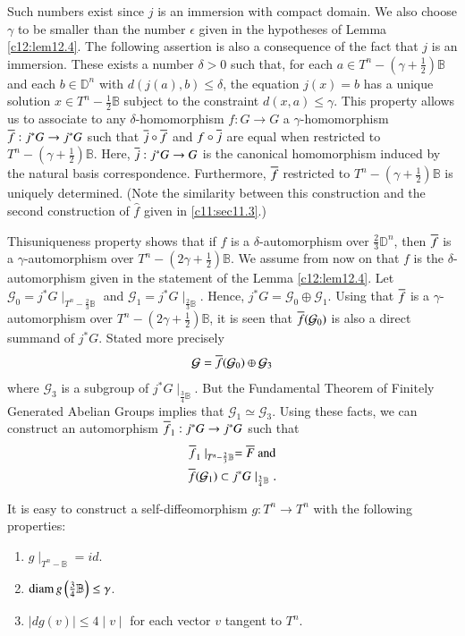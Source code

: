Such numbers exist since $j$ is an immersion with compact domain. We
also choose $\gamma$ to be smaller than the number $\epsilon$ given in
the hypotheses of Lemma \ref{c12:lem12.4}. The following assertion is
also a consequence of the fact that $j$ is an immersion. These exists
a number $\delta > 0$ such that, for each $a \in T^n- \left(\gamma +
\frac{1}{2} \right)\mathbb{B}$ and each $b \in \mathbb{D}^n$ with $d(j
(a), b)\leq \delta$, the equation $j(x) =b$ has a unique solution $x
\in T^n- \frac{1}{2} \mathbb{B}$ subject to the constraint $d(x,
a)\leq \gamma$. This property allows us to associate to any
$\delta$-homomorphism $f: G \to G$ a $\gamma$-homomorphism $\overline{f} :
j^* G \to j^* G$ such that $\overline{j} \circ \overline{f}$ and $f \circ \overline{j}$
are equal when restricted to $T^n - \left(\gamma + \frac{1}{2}
\right)\mathbb{B}$. Here, $\overline{j}: j^* G \to G$ is the canonical
homomorphism induced by the natural basis correspondence. Furthermore,
$\overline{f}$ restricted to $T^n- \left(\gamma + \frac{1}{2}
\right)\mathbb{B}$ is uniquely determined. (Note the similarity
between this construction and the second construction of $\hat{f}$
given in \ref{c11:sec11.3}.)

This\pageoriginale uniqueness property shows that if $f$ is a
$\delta$-automorphism over $\frac{2}{3} \mathbb{D}^n$, then $\overline{f}$
is a $\gamma$-automorphism over $T^n- (2 \gamma +
\frac{1}{2})\mathbb{B}$. We assume from now on that $f$ is the
$\delta$-automorphism given in the statement of the Lemma
\ref{c12:lem12.4}. Let $\mathcal{G}_0 = j^* G\mid_{T^n - \frac{2}{3}
  \mathbb{B}}$ and $\mathcal{G}_1= j^* G\mid_{\frac{2}{3}
  \mathbb{B}}$. Hence, $j^* G = \mathcal{G}_0 \oplus
\mathcal{G}_1$. Using that $\overline{f}$ is a $\gamma$-automorphism over
$T^n - (2 \gamma + \frac{1}{2})\mathbb{B}$, it is seen that $\overline{f}
(\mathcal{G}_0)$ is also a direct summand of $j^* G$. Stated more
precisely
$$
\mathcal{G} = \overline{f} (\mathcal{G}_0) \oplus \mathcal{G}_3
$$ 
where $\mathcal{G}_3$ is a subgroup of $j^*
G\mid_{\frac{3}{4}\mathbb{B}}$. But the Fundamental Theorem of
Finitely Generated Abelian Groups implies that $\mathcal{G}_1 \simeq
\mathcal{G}_3$. Using these facts, we can construct an automorphism
$\overline{f}_1: j^* G \to j^* G$ such that 
\begin{gather*}
  \overline{f}_1 \mid_{T^n- \frac{2}{3} \mathbb{B}}= \overline{F} ~\text{and}\\
  \overline{f} (\mathcal{G}_1) \subset j^* G\mid_{\frac{3}{4}\mathbb{B}}.
\end{gather*}

It is easy to construct a self-diffeomorphism $g: T^n \to T^n$ with
the following properties:
\begin{enumerate}
\item $g\mid_{T^n -\mathbb{B}}= id$.
\item $\operatorname{diam}  g \left(\frac{3}{4} \mathbb{B} \right)\leq \gamma$.
\item $|dg (v)| \leq 4 \mid v\mid$ for each vector $v$ tangent to $T^n$. 
\end{enumerate}

